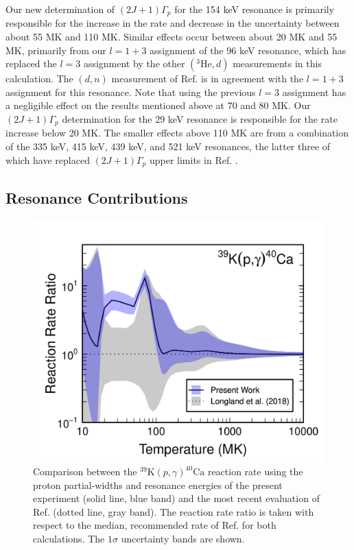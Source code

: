 Our new determination of $(2J+1)\Gamma_{p}$ for the 154 keV resonance is primarily responsible for the increase in the rate and decrease in the uncertainty between about 55 MK and 110 MK. Similar effects occur between about 20 MK and 55 MK, primarily from our $l=1+3$ assignment of the 96 keV resonance, which has replaced the $l=3$ assignment by the other $(^{3}\mathrm{He}, d)$ measurements in this calculation. The $(d,n)$ measurement of Ref. \cite{Fuchs1969} is in agreement with the $l=1+3$ assignment for this resonance. Note that using the previous $l=3$ assignment has a negligible effect on the results mentioned above at 70 and 80 MK. Our $(2J+1)\Gamma_{p}$ determination for the 29 keV resonance is responsible for the rate increase below 20 MK. The smaller effects above 110 MK are from a combination of the 335 keV, 415 keV, 439 keV, and 521 keV resonances, the latter three of which have replaced $(2J+1)\Gamma_{p}$ upper limits in Ref. \cite{Longland2018}.

\subsection{Resonance Contributions}

\begin{figure}[t]
\includegraphics[width=6.5in]{Chapter-6/figs/rateCompare.png} %
\caption{\label{fig:rateCompare}Comparison between the $^{39}\mathrm{K}(p, \gamma)^{40}\mathrm{Ca}$ reaction rate using the proton partial-widths and resonance energies of the present experiment (solid line, blue band) and the most recent evaluation of Ref. \cite{Longland2018} (dotted line, gray band). The reaction rate ratio is taken with respect to the median, recommended rate of Ref. \cite{Longland2018} for both calculations. The $1\sigma$ uncertainty bands are shown.}
\end{figure}

